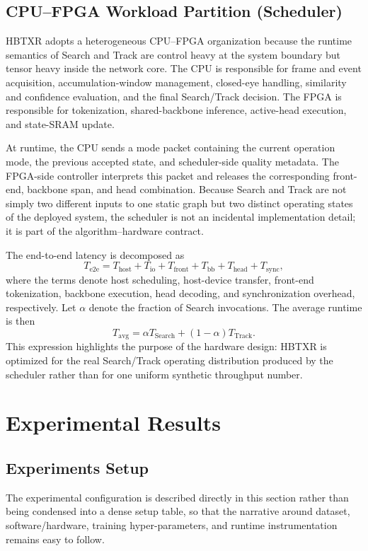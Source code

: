 \documentclass[journal]{IEEEtran}
\begin{document}
\subsection{CPU--FPGA Workload Partition (Scheduler)}
HBTXR adopts a heterogeneous CPU--FPGA organization because the runtime semantics of Search and Track are control heavy at the system boundary but tensor heavy inside the network core. The CPU is responsible for frame and event acquisition, accumulation-window management, closed-eye handling, similarity and confidence evaluation, and the final Search/Track decision. The FPGA is responsible for tokenization, shared-backbone inference, active-head execution, and state-SRAM update.

At runtime, the CPU sends a mode packet containing the current operation mode, the previous accepted state, and scheduler-side quality metadata. The FPGA-side controller interprets this packet and releases the corresponding front-end, backbone span, and head combination. Because Search and Track are not simply two different inputs to one static graph but two distinct operating states of the deployed system, the scheduler is not an incidental implementation detail; it is part of the algorithm--hardware contract.

The end-to-end latency is decomposed as
\begin{equation}
T_{\mathrm{e2e}} = T_{\mathrm{host}} + T_{\mathrm{io}} + T_{\mathrm{front}} + T_{\mathrm{bb}} + T_{\mathrm{head}} + T_{\mathrm{sync}},
\end{equation}
where the terms denote host scheduling, host-device transfer, front-end tokenization, backbone execution, head decoding, and synchronization overhead, respectively. Let $\alpha$ denote the fraction of Search invocations. The average runtime is then
\begin{equation}
T_{\mathrm{avg}} = \alpha T_{\mathrm{Search}} + (1-\alpha)T_{\mathrm{Track}}.
\end{equation}
This expression highlights the purpose of the hardware design: HBTXR is optimized for the real Search/Track operating distribution produced by the scheduler rather than for one uniform synthetic throughput number.

\section{Experimental Results}
\subsection{Experiments Setup}
The experimental configuration is described directly in this section rather than being condensed into a dense setup table, so that the narrative around dataset, software/hardware, training hyper-parameters, and runtime instrumentation remains easy to follow.
\end{document}
